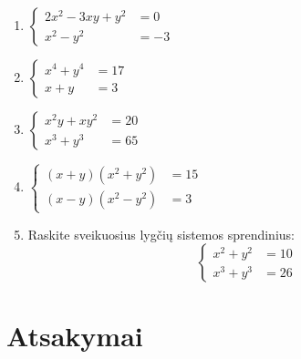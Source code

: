 \documentclass[11pt,a4paper]{scrartcl}
\begin{document}
\begin{enumerate}
    \item $\left\{\begin{aligned} 2x^2 - 3xy + y^2&=0 \\ x^2-y^2&=-3 \end{aligned}\right.$
    \item $\left\{\begin{aligned} x^4+y^4&=17 \\ x+y&=3 \end{aligned}\right.$
    \item $\left\{\begin{aligned} x^2y+xy^2&=20 \\ x^3+y^3&=65 \end{aligned}\right.$
    \item $\left\{\begin{aligned} (x+y)(x^2+y^2)&=15 \\ (x-y)(x^2-y^2)&=3 \end{aligned}\right.$
    \item Raskite sveikuosius lygčių sistemos sprendinius:$$\left\{\begin{aligned} x^2+y^2&=10 \\ x^3+y^3&=26 \end{aligned}\right.$$
\end{enumerate}

\newpage
\section*{Atsakymai}
\end{document}
